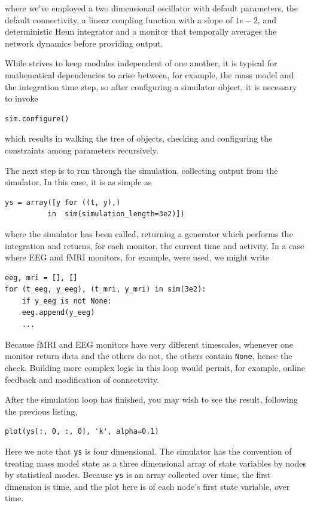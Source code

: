 \noindent where we've employed a two dimensional oscillator
with default parameters, the default connectivity, a linear 
coupling function with a slope of $1e-2$, and deterministic
Heun integrator and a monitor that temporally averages the 
network dynamics before providing output.

While \TVB strives to keep modules independent of one another,
it is typical for mathematical dependencies to arise between, 
for example, the mass model and the integration time step, so
after configuring a simulator object, it is necessary to invoke

\begin{lstlisting}
sim.configure()
\end{lstlisting}

which results in walking the tree of objects, checking and 
configuring the constraints among parameters recursively.

The next step is to run through the simulation, collecting
output from the simulator. In this case, it is as simple as
\begin{lstlisting}
ys = array([y for ((t, y),) 
	      in  sim(simulation_length=3e2)])
\end{lstlisting}
\noindent where the simulator has been called, returning a 
generator which performs the integration and returns, for each
monitor, the current time and activity. In a case where EEG 
and fMRI monitors, for example, were used, we might write
\begin{lstlisting}
eeg, mri = [], []
for (t_eeg, y_eeg), (t_mri, y_mri) in sim(3e2):
    if y_eeg is not None:
	eeg.append(y_eeg)
    ...
\end{lstlisting}
\noindent Because fMRI and EEG monitors have very different
timescales, whenever one monitor return data and the others do
not, the others contain \texttt{None}, hence the check. Building
more complex logic in this loop would permit, for example, online
feedback and modification of connectivity. 

After the simulation loop has finished, you may wish to see the
result, following the previous listing, 
\begin{lstlisting}
plot(ys[:, 0, :, 0], 'k', alpha=0.1)
\end{lstlisting}
\noindent Here we note that \texttt{ys} is four dimensional. The 
simulator has the convention of treating  mass model state as a
three dimensional array of state variables by nodes by statistical
modes. Because \texttt{ys} is an array collected over time, the first
dimension is time, and the plot here is of each node's first state
variable, over time.

